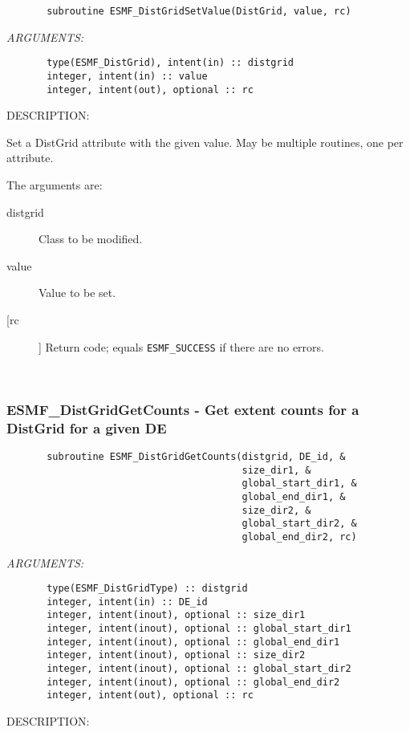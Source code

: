  
\begin{verbatim}       subroutine ESMF_DistGridSetValue(DistGrid, value, rc)\end{verbatim}{\em ARGUMENTS:}
\begin{verbatim}       type(ESMF_DistGrid), intent(in) :: distgrid
       integer, intent(in) :: value
       integer, intent(out), optional :: rc            
 \end{verbatim}
{\sf DESCRIPTION:\\ }


       Set a DistGrid attribute with the given value.
       May be multiple routines, one per attribute.
  
       The arguments are:
       \begin{description}
       \item[distgrid] 
            Class to be modified.
       \item[value]
            Value to be set.         
       \item[[rc]] 
            Return code; equals {\tt ESMF\_SUCCESS} if there are no errors.
       \end{description}
   
 
\mbox{}\hrulefill\ 
 
\subsubsection{ESMF\_DistGridGetCounts - Get extent counts for a DistGrid for a given DE}


 
\begin{verbatim}       subroutine ESMF_DistGridGetCounts(distgrid, DE_id, &
                                         size_dir1, &
                                         global_start_dir1, &
                                         global_end_dir1, &
                                         size_dir2, &
                                         global_start_dir2, &
                                         global_end_dir2, rc)\end{verbatim}{\em ARGUMENTS:}
\begin{verbatim}       type(ESMF_DistGridType) :: distgrid
       integer, intent(in) :: DE_id
       integer, intent(inout), optional :: size_dir1
       integer, intent(inout), optional :: global_start_dir1
       integer, intent(inout), optional :: global_end_dir1
       integer, intent(inout), optional :: size_dir2
       integer, intent(inout), optional :: global_start_dir2
       integer, intent(inout), optional :: global_end_dir2
       integer, intent(out), optional :: rc            
 \end{verbatim}
{\sf DESCRIPTION:\\ }


